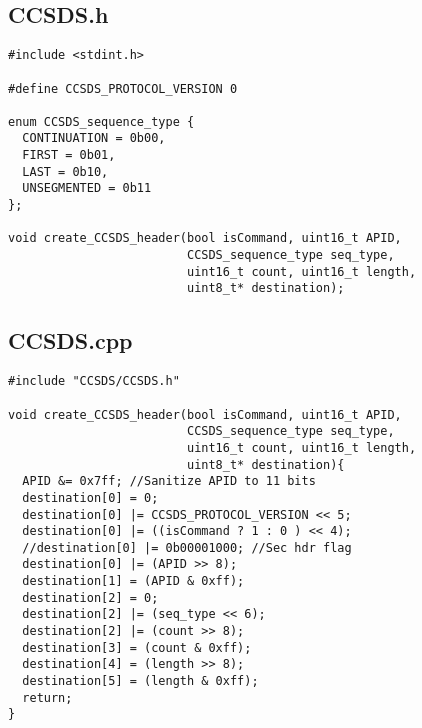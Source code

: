 \documentclass[12pt]{article}
\begin{document}
\subsection{CCSDS.h}
\begin{verbatim}
#include <stdint.h>

#define CCSDS_PROTOCOL_VERSION 0

enum CCSDS_sequence_type {
  CONTINUATION = 0b00,
  FIRST = 0b01,
  LAST = 0b10,
  UNSEGMENTED = 0b11
};

void create_CCSDS_header(bool isCommand, uint16_t APID, 
                         CCSDS_sequence_type seq_type, 
                         uint16_t count, uint16_t length, 
                         uint8_t* destination);
\end{verbatim}

\subsection{CCSDS.cpp}
\begin{verbatim}
#include "CCSDS/CCSDS.h"

void create_CCSDS_header(bool isCommand, uint16_t APID, 
                         CCSDS_sequence_type seq_type, 
                         uint16_t count, uint16_t length, 
                         uint8_t* destination){
  APID &= 0x7ff; //Sanitize APID to 11 bits
  destination[0] = 0;
  destination[0] |= CCSDS_PROTOCOL_VERSION << 5;
  destination[0] |= ((isCommand ? 1 : 0 ) << 4);
  //destination[0] |= 0b00001000; //Sec hdr flag
  destination[0] |= (APID >> 8);
  destination[1] = (APID & 0xff);
  destination[2] = 0;
  destination[2] |= (seq_type << 6);
  destination[2] |= (count >> 8);
  destination[3] = (count & 0xff);
  destination[4] = (length >> 8);
  destination[5] = (length & 0xff);
  return;
}
\end{verbatim}
\end{document}
